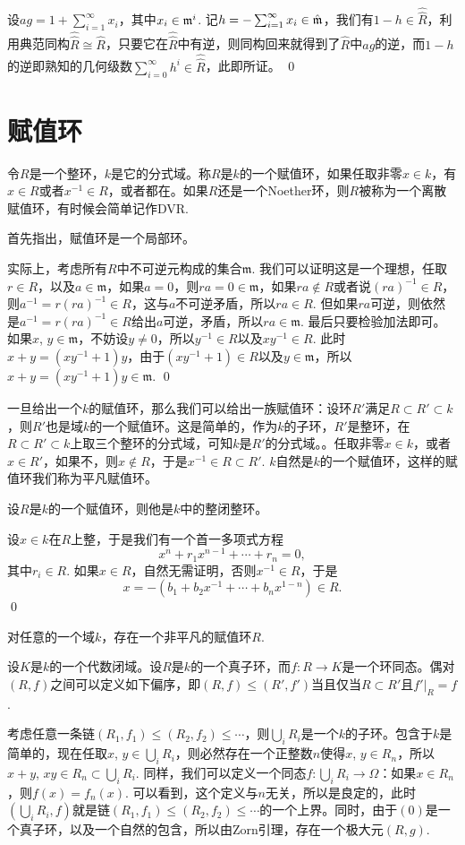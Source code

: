 	设$ag=1+\sum_{i=1}^\infty x_i$，其中$x_i\in \mathfrak{m}^i$. 记$h=-\sum_{i=1}^\infty x_i\in \hat{\mathfrak{m}}$，我们有$1-h\in \hat{\hat R}$，利用典范同构$\hat{\hat R}\cong \hat{R}$，只要它在$\hat{\hat R}$中有逆，则同构回来就得到了$\hat{R}$中$ag$的逆，而$1-h$的逆即熟知的几何级数$\sum_{i=0}^\infty h^i\in \hat{\hat R}$，此即所证。
\qed


\section{赋值环}

\para 令$R$是一个整环，$k$是它的分式域。称$R$是$k$的一个赋值环，如果任取非零$x\in k$，有$x\in R$或者$x^{-1}\in R$，或者都在。如果$R$还是一个Noether环，则$R$被称为一个离散赋值环，有时候会简单记作DVR.

首先指出，赋值环是一个局部环。

\proof 
	实际上，考虑所有$R$中不可逆元构成的集合$\mathfrak{m}$. 我们可以证明这是一个理想，任取$r\in R$，以及$a\in\mathfrak{m}$，如果$a=0$，则$ra=0\in \mathfrak{m}$，如果$ra\not\in R$或者说$(ra)^{-1}\in R$，则$a^{-1}=r(ra)^{-1}\in R$，这与$a$不可逆矛盾，所以$ra\in R$. 但如果$ra$可逆，则依然是$a^{-1}=r(ra)^{-1}\in R$给出$a$可逆，矛盾，所以$ra\in \mathfrak{m}$. 最后只要检验加法即可。如果$x$, $y\in\mathfrak{m}$，不妨设$y\neq 0$，所以$y^{-1}\in R$以及$xy^{-1}\in R$. 此时$x+y=(xy^{-1}+1)y$，由于$(xy^{-1}+1)\in R$以及$y\in\mathfrak{m}$，所以$x+y=(xy^{-1}+1)y\in \mathfrak{m}$.
\qed

\para 一旦给出一个$k$的赋值环，那么我们可以给出一族赋值环：设环$R'$满足$R\subset R'\subset k$，则$R'$也是域$k$的一个赋值环。这是简单的，作为$k$的子环，$R'$是整环，在$R\subset R'\subset k$上取三个整环的分式域，可知$k$是$R'$的分式域。。任取非零$x\in k$，或者$x\in R'$，如果不，则$x\not\in R$，于是$x^{-1}\in R\subset R'$. $k$自然是$k$的一个赋值环，这样的赋值环我们称为平凡赋值环。

\pro 设$R$是$k$的一个赋值环，则他是$k$中的整闭整环。

\proof
	设$x\in k$在$R$上整，于是我们有一个首一多项式方程
	\[
		x^n+r_1x^{n-1}+\cdots+r_n=0,
	\]
	其中$r_i\in R$. 如果$x\in R$，自然无需证明，否则$x^{-1}\in R$，于是
	\[
		x=-(b_1+b_2x^{-1}+\cdots+b_n x^{1-n})\in R.
	\]
\qed

\pro 对任意的一个域$k$，存在一个非平凡的赋值环$R$.

\proof
	设$K$是$k$的一个代数闭域。设$R$是$k$的一个真子环，而$f:R\to K$是一个环同态。偶对$(R,f)$之间可以定义如下偏序，即$(R,f)\leq (R',f')$当且仅当$R\subset R'$且$f'|_R=f$.

	考虑任意一条链$(R_1,f_1)\leq (R_2,f_2)\leq \cdots$，则$\bigcup_i R_i$是一个$k$的子环。包含于$k$是简单的，现在任取$x$, $y\in \bigcup_i R_i$，则必然存在一个正整数$n$使得$x$, $y\in R_n$，所以$x+y$, $xy\in R_n\subset \bigcup_i R_i$. 同样，我们可以定义一个同态$f:\bigcup_i R_i\to \Omega$：如果$x\in R_n$，则$f(x)=f_n(x)$. 可以看到，这个定义与$n$无关，所以是良定的，此时$(\bigcup_i R_i,f)$就是链$(R_1,f_1)\leq (R_2,f_2)\leq \cdots$的一个上界。同时，由于$(0)$是一个真子环，以及一个自然的包含，所以由Zorn引理，存在一个极大元$(R,g)$.

